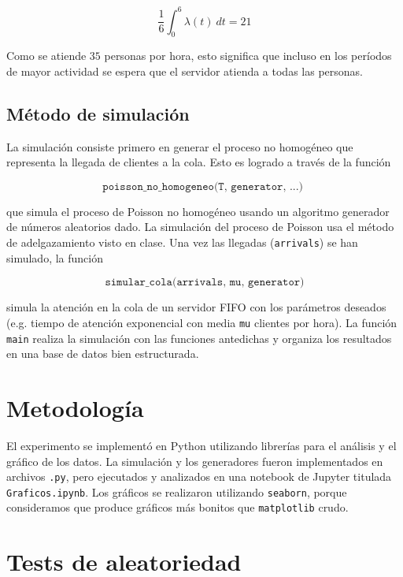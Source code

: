 \documentclass[a4paper, 12pt]{article}
\begin{document}
\begin{equation}
    \frac{1}{6}\int_0^{6}\lambda(t) ~ dt = 21
\end{equation}

Como se atiende $35$ personas por hora, esto significa que incluso en los
períodos de mayor actividad se espera que el servidor atienda a todas las
personas.

\subsection{Método de simulación}

La simulación consiste primero en generar el proceso no homogéneo que representa
la llegada de clientes a la cola. Esto es logrado a través de la función 

\begin{equation*}
    \texttt{poisson\_no\_homogeneo(T, generator, ...) }
\end{equation*}

que simula el proceso de Poisson no homogéneo usando un algoritmo generador de
números aleatorios dado. La simulación del proceso de Poisson usa el método de
adelgazamiento visto en clase. Una vez las llegadas (\texttt{arrivals}) se han simulado, la función

\begin{equation*}
\texttt{simular\_cola(arrivals, mu, generator)}
\end{equation*}

simula la atención en la cola de un servidor FIFO con los parámetros deseados
(e.g. tiempo de atención exponencial con media \texttt{mu} clientes por hora). La función \texttt{main}
realiza la simulación con las funciones antedichas y organiza los resultados en
una base de datos bien estructurada.


\section{Metodología}

El experimento se implementó en Python utilizando librerías para el análisis y
el gráfico de los datos. La simulación y los generadores fueron implementados en
archivos \texttt{.py}, pero ejecutados y analizados en una notebook de Jupyter
titulada \texttt{Graficos.ipynb}. Los gráficos se realizaron utilizando
\texttt{seaborn}, porque consideramos que produce gráficos más bonitos que
\texttt{matplotlib} crudo. 

\section{Tests de aleatoriedad}
\end{document}
